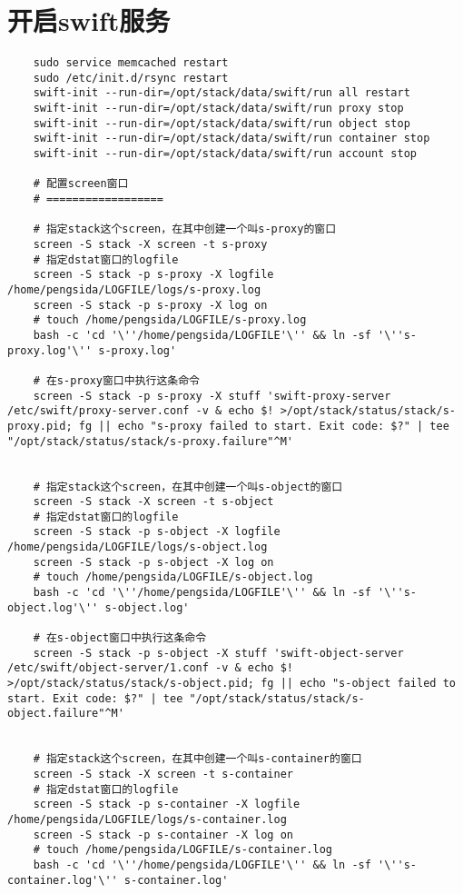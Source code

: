 \documentclass[a4paper,left=1.5cm,right=1.5cm,11pt]{article}
\begin{document}
\section{开启swift服务}
	\begin{lstlisting}
	sudo service memcached restart
	sudo /etc/init.d/rsync restart
    swift-init --run-dir=/opt/stack/data/swift/run all restart
	swift-init --run-dir=/opt/stack/data/swift/run proxy stop
	swift-init --run-dir=/opt/stack/data/swift/run object stop
	swift-init --run-dir=/opt/stack/data/swift/run container stop
	swift-init --run-dir=/opt/stack/data/swift/run account stop

	# 配置screen窗口
	# ==================

	# 指定stack这个screen，在其中创建一个叫s-proxy的窗口
	screen -S stack -X screen -t s-proxy
	# 指定dstat窗口的logfile
	screen -S stack -p s-proxy -X logfile /home/pengsida/LOGFILE/logs/s-proxy.log
    screen -S stack -p s-proxy -X log on
	# touch /home/pengsida/LOGFILE/s-proxy.log
    bash -c 'cd '\''/home/pengsida/LOGFILE'\'' && ln -sf '\''s-proxy.log'\'' s-proxy.log'

	# 在s-proxy窗口中执行这条命令
	screen -S stack -p s-proxy -X stuff 'swift-proxy-server /etc/swift/proxy-server.conf -v & echo $! >/opt/stack/status/stack/s-proxy.pid; fg || echo "s-proxy failed to start. Exit code: $?" | tee "/opt/stack/status/stack/s-proxy.failure"^M'


	# 指定stack这个screen，在其中创建一个叫s-object的窗口
	screen -S stack -X screen -t s-object
	# 指定dstat窗口的logfile
	screen -S stack -p s-object -X logfile /home/pengsida/LOGFILE/logs/s-object.log
    screen -S stack -p s-object -X log on
	# touch /home/pengsida/LOGFILE/s-object.log
    bash -c 'cd '\''/home/pengsida/LOGFILE'\'' && ln -sf '\''s-object.log'\'' s-object.log'

	# 在s-object窗口中执行这条命令
	screen -S stack -p s-object -X stuff 'swift-object-server /etc/swift/object-server/1.conf -v & echo $! >/opt/stack/status/stack/s-object.pid; fg || echo "s-object failed to start. Exit code: $?" | tee "/opt/stack/status/stack/s-object.failure"^M'


	# 指定stack这个screen，在其中创建一个叫s-container的窗口
	screen -S stack -X screen -t s-container
	# 指定dstat窗口的logfile
	screen -S stack -p s-container -X logfile /home/pengsida/LOGFILE/logs/s-container.log
    screen -S stack -p s-container -X log on
	# touch /home/pengsida/LOGFILE/s-container.log
    bash -c 'cd '\''/home/pengsida/LOGFILE'\'' && ln -sf '\''s-container.log'\'' s-container.log'


\end{lstlisting}
\end{document}
